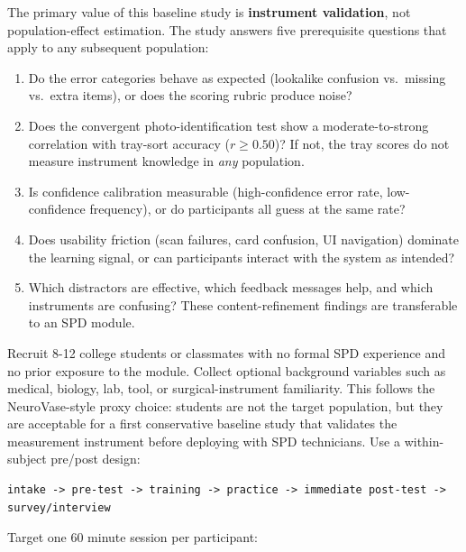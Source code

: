 \documentclass[10pt,a4paper]{article}
\begin{document}
The primary value of this baseline study is \textbf{instrument validation}, not
population-effect estimation. The study answers five prerequisite questions
that apply to any subsequent population:
\begin{enumerate}
  \item Do the error categories behave as expected (lookalike confusion vs.\
  missing vs.\ extra items), or does the scoring rubric produce noise?
  \item Does the convergent photo-identification test show a moderate-to-strong
  correlation with tray-sort accuracy ($r \ge 0.50$)? If not, the tray scores
  do not measure instrument knowledge in \emph{any} population.
  \item Is confidence calibration measurable (high-confidence error rate,
  low-confidence frequency), or do participants all guess at the same rate?
  \item Does usability friction (scan failures, card confusion, UI navigation)
  dominate the learning signal, or can participants interact with the system
  as intended?
  \item Which distractors are effective, which feedback messages help, and
  which instruments are confusing? These content-refinement findings are
  transferable to an SPD module.
\end{enumerate}
Recruit 8-12 college students or classmates with no formal SPD experience and
no prior exposure to the module. Collect optional background variables such as
medical, biology, lab, tool, or surgical-instrument familiarity. This follows
the NeuroVase-style proxy choice: students are not the target population, but
they are acceptable for a first conservative baseline study that validates the
measurement instrument before deploying with SPD technicians.
Use a within-subject pre/post design:
\begin{lstlisting}
intake -> pre-test -> training -> practice -> immediate post-test -> survey/interview
\end{lstlisting}
Target one 60 minute session per participant:
\end{document}

